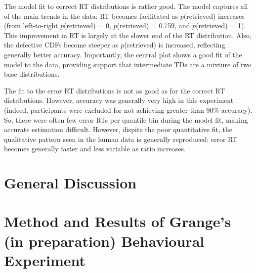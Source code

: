 \documentclass[a4paper, jou, natbib]{apa6}
\begin{document}
The model fit to correct RT distributions is rather good. The model captures all of the main trends in the data: RT becomes facilitated as $p$(retrieved) increases (from left-to-right $p$(retrieved) = 0, $p$(retrieved) = 0.759, and $p$(retrieved) = 1). This improvement in RT is largely at the slower end of the RT distribution. Also, the defective CDFs become steeper as $p$(retrieved) is increased, reflecting generally better accuracy. Importantly, the central plot shows a good fit of the model to the data, providing support that intermediate TDs are a mixture of two base distributions. 

The fit to the error RT distributions is not as good as for the correct RT distributions. However, accuracy was generally very high in this experiment (indeed, participants were excluded for not achieving greater than 90\% accuracy). So, there were often few error RTs per quantile bin during the model fit, making accurate estimation difficult. However, dispite the poor quantitative fit, the qualitative pattern seen in the human data is generally reproduced: error RT becomes generally faster and less variable as ratio increases.


\section{General Discussion}





\appendix
\section{Method and Results of Grange's (in preparation) Behavioural Experiment}
\end{document}
